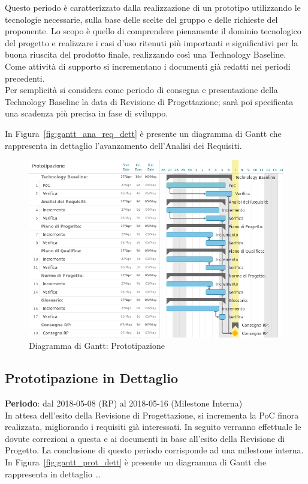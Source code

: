 Questo periodo è caratterizzato dalla realizzazione di un prototipo utilizzando le tecnologie necessarie, sulla base delle scelte del gruppo \Gruppo e delle richieste del proponente.
Lo scopo è quello di comprendere pienamente il dominio tecnologico del progetto e realizzare i casi d'uso ritenuti più importanti e significativi per la buona riuscita del prodotto finale, realizzando così una Technology Baseline. \\ 
Come attività di supporto si incrementano i documenti già redatti nei periodi precedenti.\\
Per semplicità si considera come periodo di consegna e presentazione della Technology Baseline la data di Revisione di Progettazione; sarà poi specificata una scadenza più precisa in fase di sviluppo.

In Figura~\ref{fig:gantt_ana_req_dett} è presente un diagramma di Gantt che rappresenta in dettaglio l'avanzamento dell'Analisi dei Requisiti. 

\begin{figure}[h!]
	\centerline{\includegraphics[scale=0.5]{img/DiagrammiGantt/Prototipazione.jpg}}
	\caption{Diagramma di Gantt: Prototipazione}
	\label{fig:gantt_prot}
\end{figure}
\clearpage

\subsection{Prototipazione in Dettaglio}
\textbf{Periodo}: dal 2018-05-08 (RP) al 2018-05-16 (Milestone Interna)\\

In attesa dell'esito della Revisione di Progettazione, si incrementa la PoC finora realizzata, migliorando i requisiti già interessati. In seguito verranno effettuale le dovute correzioni a questa e ai documenti in base all'esito della Revisione di Progetto. La conclusione di questo periodo corrisponde ad una milestone interna.
In Figura~\ref{fig:gantt_prot_dett} è presente un diagramma di Gantt che rappresenta in dettaglio \dots

